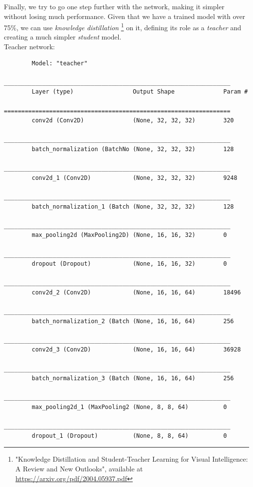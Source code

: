 Finally, we try to go one step further with the network, making it simpler without losing much performance.
Given that we have a trained model with over 75\%, we can use \emph{knowledge distillation}
\footnote{"Knowledge Distillation and Student-Teacher Learning for Visual Intelligence: A Review and
New Outlooks", available at \href{https://arxiv.org/pdf/2004.05937.pdf}{https://arxiv.org/pdf/2004.05937.pdf}}
on it, defining its role as a \emph{teacher} and creating a much simpler \emph{student} model.\\
Teacher network:
\begin{center}
    \begin{verbatim}
        Model: "teacher"
        _________________________________________________________________
        Layer (type)                 Output Shape              Param #   
        =================================================================
        conv2d (Conv2D)              (None, 32, 32, 32)        320       
        _________________________________________________________________
        batch_normalization (BatchNo (None, 32, 32, 32)        128       
        _________________________________________________________________
        conv2d_1 (Conv2D)            (None, 32, 32, 32)        9248      
        _________________________________________________________________
        batch_normalization_1 (Batch (None, 32, 32, 32)        128       
        _________________________________________________________________
        max_pooling2d (MaxPooling2D) (None, 16, 16, 32)        0         
        _________________________________________________________________
        dropout (Dropout)            (None, 16, 16, 32)        0         
        _________________________________________________________________
        conv2d_2 (Conv2D)            (None, 16, 16, 64)        18496     
        _________________________________________________________________
        batch_normalization_2 (Batch (None, 16, 16, 64)        256       
        _________________________________________________________________
        conv2d_3 (Conv2D)            (None, 16, 16, 64)        36928     
        _________________________________________________________________
        batch_normalization_3 (Batch (None, 16, 16, 64)        256       
        _________________________________________________________________
        max_pooling2d_1 (MaxPooling2 (None, 8, 8, 64)          0         
        _________________________________________________________________
        dropout_1 (Dropout)          (None, 8, 8, 64)          0         

\end{verbatim}
\end{center}

